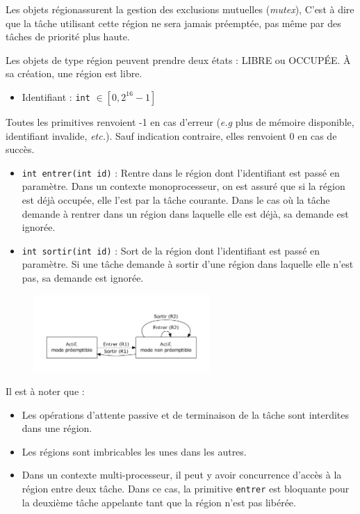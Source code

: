 {
	Les objets \og région\fg assurent la gestion des exclusions mutuelles (\textsl{mutex}), C'est à dire que la tâche utilisant cette région ne sera jamais préemptée, pas même par des tâches de priorité plus haute.

	Les objets de type région peuvent prendre deux états : LIBRE ou OCCUPÉE. À sa création, une région est libre.
}
{
	\begin{itemize}
		\item Identifiant : \lstinline{int} $\in [0, 2^{16} - 1]$
	\end{itemize}
}
{
	Toutes les primitives renvoient -1 en cas d'erreur (\textsl{e.g} plus de mémoire disponible, identifiant invalide, \textsl{etc.}). Sauf indication contraire, elles renvoient 0 en cas de succès.

	\begin{itemize}
		\item \lstinline{int entrer(int id)} : Rentre dans le région dont l'identifiant est passé en paramètre. Dans un contexte monoprocesseur, on est assuré que si la région est déjà occupée, elle l'est par la tâche courante. Dans le cas où la tâche demande à rentrer dans un région dans laquelle elle est déjà, sa demande est ignorée.
		\item \lstinline{int sortir(int id)} : Sort de la région dont l'identifiant est passé en paramètre. Si une tâche demande à sortir d'une région dans laquelle elle n'est pas, sa demande est ignorée.
	\end{itemize}
}
{
\begin{figure} [htp]
\centering
\includegraphics[width=0.6\textwidth]{img/etatRegion.pdf}
\end{figure}
}
{
	Il est à noter que :
	\begin{itemize}
		\item Les opérations d'attente passive et de terminaison de la tâche sont interdites dans une région.
		\item Les régions sont imbricables les unes dans les autres.
		\item Dans un contexte multi-processeur, il peut y avoir concurrence d'accès à la région entre deux tâche. Dans ce cas, la primitive \lstinline{entrer} est bloquante pour la deuxième tâche appelante tant que la région n'est pas libérée.
	\end{itemize}
}
